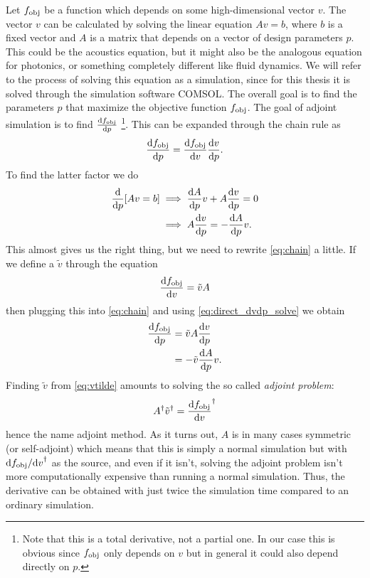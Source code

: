 Let $f_\text{obj}$ be a function which depends on some high-dimensional vector $v$.
The vector $v$ can be calculated by solving the linear equation
$A v = b$, where $b$ is a fixed vector and $A$ is a matrix that depends on a
vector of design parameters $p$.
This could be the acoustics equation, but it might also be the analogous
equation for photonics, or something completely different like fluid dynamics.
We will refer to the process of solving this equation as a simulation, since for
this thesis it is solved through the simulation software COMSOL.
The overall goal is to find the parameters $p$ that maximize the objective
function $f_\text{obj}$.
The goal of adjoint simulation is to find $\diff{\fobj}{p}$%
\footnote{%
	Note that this is a total derivative, not a partial one. In our case this is
	obvious since $f_\text{obj}$ only depends on $v$ but in general it could also
	depend directly on $p$.
}.
This can be expanded through the chain rule as
\begin{equation}\label{eq:chain}
	\diff{\fobj}{p} = \diff{\fobj}{v} \diff{v}{p}.
\end{equation}
To find the latter factor we do
\begin{align}
	\diff{}{p} [Av = b] &\implies \diff{A}{p} v + A \diff{v}{p} = 0\\
						&\implies A\diff{v}{p} = -\diff{A}{p}
						v.\label{eq:direct_dvdp_solve}
\end{align}
This almost gives us the right thing, but we need to rewrite \cref{eq:chain} a
little.
If we define a $\tilde v$ through the equation
\begin{equation}\label{eq:vtilde}
	\diff{\fobj}{v} = \tilde v A
\end{equation}
then plugging this into \cref{eq:chain} and using \cref{eq:direct_dvdp_solve} we
obtain
\begin{align}
	\label{eq:dfdp_vtilde}
	\diff{\fobj}{p} &=
	\tilde v A \diff{v}{p}\\
	&=
	-\tilde v \diff{A}{p} v.
\end{align}
Finding $\tilde v$ from \cref{eq:vtilde} amounts to solving the so called
\emph{adjoint problem}:
\begin{equation}
	A^\dagger \tilde v^\dagger = \diff{\fobj}{v}^\dagger
\end{equation}
hence the name adjoint method.
As it turns out, $A$ is in many cases symmetric (or self-adjoint) which means that this is simply a normal
simulation but with $\difs{\fobj}{v}^\dagger$ as the source, and even if it
isn't, solving the adjoint problem isn't more computationally expensive than
running a normal simulation.
Thus, the derivative can be obtained with just twice the simulation time
compared to an ordinary simulation.


